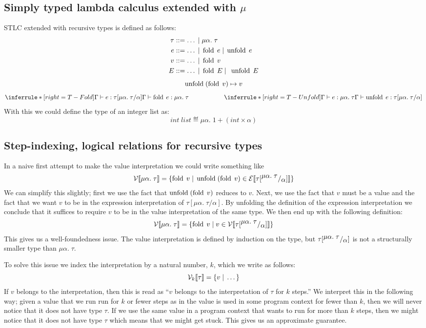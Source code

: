 \subsection*{Simply typed lambda calculus extended with $\mu$}
STLC extended with recursive types is defined as follows:
\begin{align*}
  \tau &::= \dots \; | \; \mu \alpha. \; \tau \\
  e    &::= \dots \; | \; \operatorname{fold} \; e \; | \; \operatorname{unfold} \; e \\
  v    &::= \dots \; | \; \operatorname{fold} \; v\\
  E    &::= \dots \; | \; \operatorname{fold} \; E \; | \; \; \operatorname{unfold} \; E
\end{align*}
\[
\operatorname{unfold} \; (\operatorname{fold} \; v) \mapsto v
\]
\[
\TFold \hspace{2cm} \TUnfold
\]
With this we could define the type of an integer list as:
\[
int\; list \eqdef \mu\alpha.\; 1 + (int \times \alpha)
\]
\begin{comment}
\[
  \Omega = (\tlabs{x}{\mu\alpha.\; \tarrow{\alpha}{\tau}}{(\unfold \; x) \; x}) 
\]
\end{comment}

\subsection*{Step-indexing, logical relations for recursive types}
In a naive first attempt to make the value interpretation we could write something like
\[
  \mathcal{V}\llbracket \mu\alpha. \; \tau \rrbracket = \{\operatorname{fold} \; v \; | \; \operatorname{unfold} \; (\operatorname{fold} \; v) \in \mathcal{E}\llbracket \tau[^{\textstyle \mu\alpha.\;\tau}/_{\textstyle \alpha}] \rrbracket \}
\]
We can simplify this slightly; first we use the fact that $\operatorname{unfold} \; (\operatorname{fold} \; v)$ reduces to $v$. Next, we use the fact that $v$ must be a value and the fact that we want $v$ to be in the expression interpretation of $\tau[\mu \alpha. \; \tau / \alpha]$. By unfolding the definition of the expression interpretation we conclude that it suffices to require $v$ to be in the value interpretation of the same type. We then end up with the following definition:
\[
  \mathcal{V}\llbracket \mu\alpha. \; \tau \rrbracket = \{\operatorname{fold} \; v \; | \; v \in \mathcal{V}\llbracket \tau[^{\textstyle \mu\alpha.\;\tau}/_{\textstyle \alpha}] \rrbracket \}
\]
This gives us a well-foundedness issue. The value interpretation is defined by induction on the type, but $\tau[^{\textstyle \mu\alpha.\;\tau}/_{\textstyle \alpha}]$ is not a structurally smaller type than $\mu\alpha. \; \tau$. 

To solve this issue we index the interpretation by a natural number, $k$, which we write as follows:
\[
  \mathcal{V}_{k}\llbracket \tau \rrbracket = \{v \; | \; \dots \}
\]
If $v$ belongs to the interpretation, then this is read as ``$v$ belongs to the interpretation of $\tau$ for $k$ steps.'' We interpret this in the following way; given a value that we run run for $k$ or fewer steps as in the value is used in some program context for fewer than $k$, then we will never notice that it does not have type $\tau$. If we use the same value in a program context that wants to run for more than $k$ steps, then we might notice that it does not have type $\tau$ which means that we might get stuck. This gives us an approximate guarantee.

